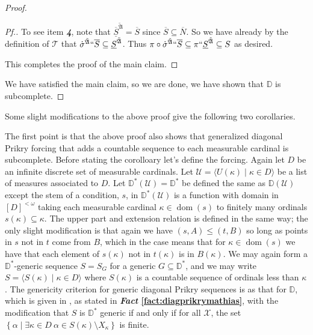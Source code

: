 \documentclass{amsart}
\theoremstyle{definition}
\theoremstyle{remark}
\newcommand{\D}{\mathbb{D}}
\newcommand{\U}{\mathcal{U}}
\DeclareMathOperator{\dom}{dom}
\newcommand{\st}{\; | \;}
\newcommand{\set}[2]{\left\{#1\st #2 \right\}}
\newcommand{\seq}[2]{\langle #1 \st #2 \rangle}
\begin{document}
\begin{proof}
\begin{proof}[Pf.]
To see item \textsl{\textbf{4}}, note that $\overline{\underline S}^{\tilde{\mathfrak A}} = \overline S$ since $\overline S \subseteq \overline N$. So we have already by the definition of $\mathcal T$  that $\dot{\sigma}^{\tilde{\mathfrak A}}``\overline S \subseteq \underline S^{\tilde{\mathfrak A}}$. Thus $\pi \circ \dot{\sigma}^{\tilde{\mathfrak A}}``\overline S \subseteq \pi `` \underline S^{\tilde{\mathfrak A}} \subseteq S$ as desired. %

This completes the proof of the main claim.
\end{proof}
We have satisfied the main claim, so we are done, we have shown that $\D$ is subcomplete.
\end{proof}

Some slight modifications to the above proof give the following two corollaries.

The first point is that the above proof also shows that generalized diagonal Prikry forcing that adds a countable sequence to each measurable cardinal is subcomplete. Before stating the corolloary let's define the forcing. Again let $D$ be an infinite discrete set of measurable cardinals. Let $\U = \seq{ U(\kappa) }{ \kappa \in D }$ be a list of measures associated to $D$. 
Let $\D^*(\U) = \D^*$ be defined the same as $\D(\U)$ except the stem of a condition, $s$, in $\D^*(\U)$ is a function with domain in $[D]^{<\omega}$ taking each measurable cardinal $\kappa \in \dom(s)$ to finitely many ordinals $s(\kappa) \subseteq \kappa$. The upper part and extension relation is defined in the same way; the only slight modification is that again we have $(s, A) \leq (t, B)$ so long as points in $s$ not in $t$ come from $B$, which in the case means that for $\kappa \in \dom(s)$ we have that each element of $s(\kappa)$ not in $t(\kappa)$ is in $B(\kappa)$. We may again form a $\D^*$-generic sequence $S = S_G$ for a generic $G \subseteq \D^*$, and we may write $S = \seq{ S(\kappa) }{ \kappa \in D }$ where $S(\kappa)$ is a countable sequence of ordinals less than $\kappa$. The genericity criterion for generic diagonal Prikry sequences is as that for $\D$, which is given in  \cite[Theorem 1]{Fuchs:2005kx}, as stated in \textbf{\emph{Fact} \ref{fact:diagprikrymathias}}, with the modification that $S$ is $\D^*$ generic if and only if for all $\mathcal X$, the set $\set{ \alpha }{ \exists \kappa \in D \ \alpha \in S(\kappa) \setminus X_\kappa }$ is finite.
\end{document}
